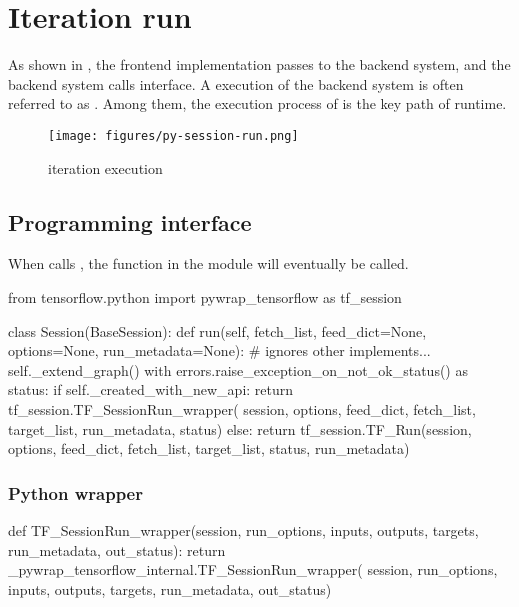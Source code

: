 \section{Iteration run}
\begin{content}
As shown in , the  frontend implementation passes  to the backend system, and the backend system calls  interface. A  execution of the backend system is often referred to as . Among them, the execution process of  is the key path of  runtime.

\begin{figure}[H]
  \centering
  \texttt{[image: figures/py-session-run.png]}
  \caption{iteration execution}
  \label{fig:py-session-run}
\end{figure}


\subsection{Programming interface}
When  calls , the function in the  module will eventually be called.

\begin{leftbar}
\begin{python}[caption={tensorflow/python/client/session.py}]
from tensorflow.python import pywrap_tensorflow as tf_session

class Session(BaseSession):
  def run(self, fetch_list, feed_dict=None, options=None, run_metadata=None):
    # ignores other implements...
    self._extend_graph()
    with errors.raise_exception_on_not_ok_status() as status:
      if self._created_with_new_api:
        return tf_session.TF_SessionRun_wrapper(
            session, options, feed_dict, fetch_list, target_list,
            run_metadata, status)
      else:
        return tf_session.TF_Run(session, options,
                                 feed_dict, fetch_list, target_list,
                                 status, run_metadata)
\end{python}
\end{leftbar}


\subsubsection{Python wrapper}

\begin{leftbar}
\begin{python}[caption={tensorflow/bazel-bin/tensorflow/python/pywrap\_tensorflow\_internal.py}]
def TF_SessionRun_wrapper(session, run_options, inputs, 
  outputs, targets, run_metadata, out_status):
  return _pywrap_tensorflow_internal.TF_SessionRun_wrapper(
    session, run_options, inputs, outputs, targets, run_metadata, out_status)


\end{python}
\end{leftbar}
\end{content}

